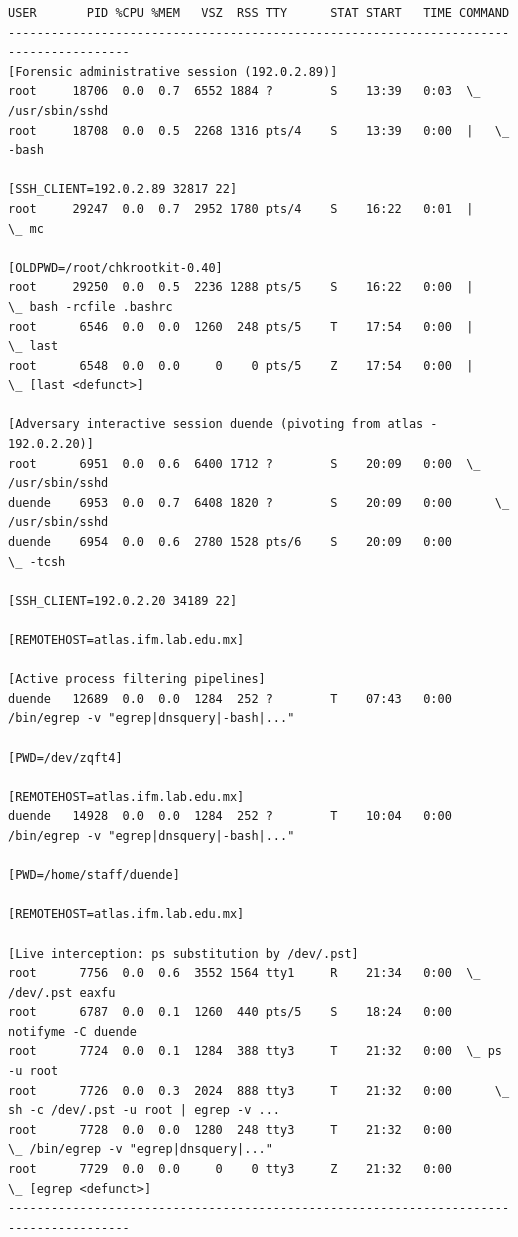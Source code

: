 \begin{lstlisting}[style=terminal]
USER       PID %CPU %MEM   VSZ  RSS TTY      STAT START   TIME COMMAND
---------------------------------------------------------------------------------------
[Forensic administrative session (192.0.2.89)]
root     18706  0.0  0.7  6552 1884 ?        S    13:39   0:03  \_ /usr/sbin/sshd
root     18708  0.0  0.5  2268 1316 pts/4    S    13:39   0:00  |   \_ -bash
                                                       [SSH_CLIENT=192.0.2.89 32817 22]
root     29247  0.0  0.7  2952 1780 pts/4    S    16:22   0:01  |       \_ mc
                                                       [OLDPWD=/root/chkrootkit-0.40]
root     29250  0.0  0.5  2236 1288 pts/5    S    16:22   0:00  |           \_ bash -rcfile .bashrc
root      6546  0.0  0.0  1260  248 pts/5    T    17:54   0:00  |               \_ last
root      6548  0.0  0.0     0    0 pts/5    Z    17:54   0:00  |                   \_ [last <defunct>]

[Adversary interactive session duende (pivoting from atlas - 192.0.2.20)]
root      6951  0.0  0.6  6400 1712 ?        S    20:09   0:00  \_ /usr/sbin/sshd
duende    6953  0.0  0.7  6408 1820 ?        S    20:09   0:00      \_ /usr/sbin/sshd
duende    6954  0.0  0.6  2780 1528 pts/6    S    20:09   0:00          \_ -tcsh
                                                       [SSH_CLIENT=192.0.2.20 34189 22]
                                                       [REMOTEHOST=atlas.ifm.lab.edu.mx]

[Active process filtering pipelines]
duende   12689  0.0  0.0  1284  252 ?        T    07:43   0:00 /bin/egrep -v "egrep|dnsquery|-bash|..."
                                                       [PWD=/dev/zqft4]
                                                       [REMOTEHOST=atlas.ifm.lab.edu.mx]
duende   14928  0.0  0.0  1284  252 ?        T    10:04   0:00 /bin/egrep -v "egrep|dnsquery|-bash|..."
                                                       [PWD=/home/staff/duende]
                                                       [REMOTEHOST=atlas.ifm.lab.edu.mx]

[Live interception: ps substitution by /dev/.pst]
root      7756  0.0  0.6  3552 1564 tty1     R    21:34   0:00  \_ /dev/.pst eaxfu
root      6787  0.0  0.1  1260  440 pts/5    S    18:24   0:00 notifyme -C duende
root      7724  0.0  0.1  1284  388 tty3     T    21:32   0:00  \_ ps -u root
root      7726  0.0  0.3  2024  888 tty3     T    21:32   0:00      \_ sh -c /dev/.pst -u root | egrep -v ...
root      7728  0.0  0.0  1280  248 tty3     T    21:32   0:00          \_ /bin/egrep -v "egrep|dnsquery|..."
root      7729  0.0  0.0     0    0 tty3     Z    21:32   0:00              \_ [egrep <defunct>]
---------------------------------------------------------------------------------------
\end{lstlisting}


